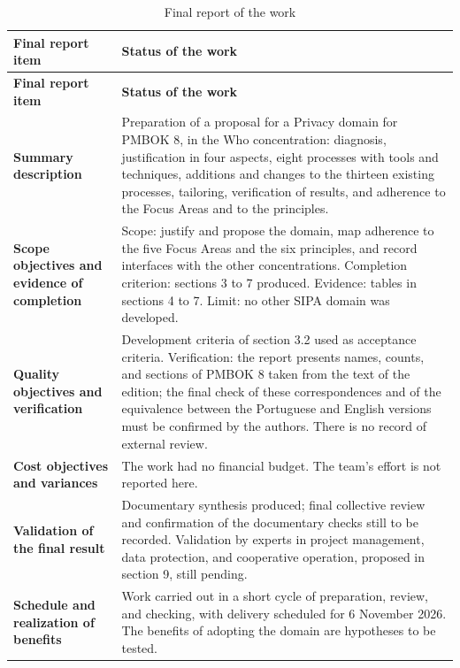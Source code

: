 \documentclass[11pt,a4paper]{article}
\newcommand{\SingleSpacing}{}
\begin{document}
\begingroup\SingleSpacing\small
\begin{longtable}{@{}>{\raggedright\arraybackslash}p{}>{\raggedright\arraybackslash}p{}@{}}
\caption{Final report of the work}\label{tab:t12}\\
\toprule
\textbf{Final report item} & \textbf{Status of the work}\\
\midrule
\endfirsthead
\toprule
\textbf{Final report item} & \textbf{Status of the work}\\
\midrule
\endhead
\bottomrule
\endfoot
\bottomrule
\endlastfoot
\textbf{Summary description} & Preparation of a proposal for a Privacy domain for PMBOK 8, in the Who concentration: diagnosis, justification in four aspects, eight processes with tools and techniques, additions and changes to the thirteen existing processes, tailoring, verification of results, and adherence to the Focus Areas and to the principles.\\[3pt]
\textbf{Scope objectives and evidence of completion} & Scope: justify and propose the domain, map adherence to the five Focus Areas and the six principles, and record interfaces with the other concentrations. Completion criterion: sections 3 to 7 produced. Evidence: tables in sections 4 to 7. Limit: no other SIPA domain was developed.\\[3pt]
\textbf{Quality objectives and verification} & Development criteria of section 3.2 used as acceptance criteria. Verification: the report presents names, counts, and sections of PMBOK 8 taken from the text of the edition; the final check of these correspondences and of the equivalence between the Portuguese and English versions must be confirmed by the authors. There is no record of external review.\\[3pt]
\textbf{Cost objectives and variances} & The work had no financial budget. The team's effort is not reported here.\\[3pt]
\textbf{Validation of the final result} & Documentary synthesis produced; final collective review and confirmation of the documentary checks still to be recorded. Validation by experts in project management, data protection, and cooperative operation, proposed in section 9, still pending.\\[3pt]
\textbf{Schedule and realization of benefits} & Work carried out in a short cycle of preparation, review, and checking, with delivery scheduled for 6 November 2026. The benefits of adopting the domain are hypotheses to be tested.\\[3pt]

\end{longtable}
\end{document}
